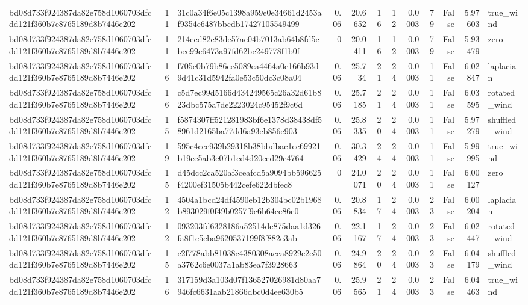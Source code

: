 \begin{tabular}{lrlrrrrrrrrl}
bd08d733f924387da82e758d1060703dfcdd121f360b7e8765189d8b7446e202 & 11 & 31c0a34f6e05c1398a959e0e34661d2453af9354e6487bbcdb17427105549499 & 0.06 & 20.6652 & 16 & 12 & 0.0003 & 79 & False & 5.97603 & true\_wind \\
bd08d733f924387da82e758d1060703dfcdd121f360b7e8765189d8b7446e202 & 11 & 214ecd82c83de57ae04b7013ab64b8fd5cbee99c6473a97fd62bc249778f1b0f & 0 & 20.0411 & 16 & 12 & 0.0003 & 79 & False & 5.93479 & zero \\
bd08d733f924387da82e758d1060703dfcdd121f360b7e8765189d8b7446e202 & 16 & f705c0b79b86ee5089ea4464a0e166b93d9d41c31d5942fa0e53c50dc3c08a04 & 0.06 & 25.734 & 21 & 24 & 0.0003 & 11 & False & 6.02847 & laplacian \\
bd08d733f924387da82e758d1060703dfcdd121f360b7e8765189d8b7446e202 & 16 & c5d7ec99d5166d434249565c26a32d61b823dbc575a7de2223024c95452f9c6d & 0.06 & 25.7185 & 21 & 24 & 0.0003 & 11 & False & 6.03595 & rotated\_wind \\
bd08d733f924387da82e758d1060703dfcdd121f360b7e8765189d8b7446e202 & 15 & f5874307ff521281983bf6e1378d38438df58961d2165ba77dd6a93eb856e903 & 0.06 & 25.8335 & 20 & 24 & 0.0003 & 11 & False & 5.97279 & shuffled\_wind \\
bd08d733f924387da82e758d1060703dfcdd121f360b7e8765189d8b7446e202 & 19 & 595c4cee939b29318b38bbdbac1ec69921b19ce5ab3c07b1cd4d20eed29c4764 & 0.06 & 30.3429 & 24 & 24 & 0.0003 & 11 & False & 5.99995 & true\_wind \\
bd08d733f924387da82e758d1060703dfcdd121f360b7e8765189d8b7446e202 & 15 & d45dcc2ca520af3ceafcd5a9094bb596625f4200ef31505b442cefe622dbfec8 & 0 & 24.0071 & 20 & 24 & 0.0003 & 11 & False & 6.00127 & zero \\
bd08d733f924387da82e758d1060703dfcdd121f360b7e8765189d8b7446e202 & 12 & 4504a1bcd24df4590eb12b304bc02b1968b893029f0f49b0257f9c6b64ce86e0 & 0.06 & 20.8834 & 17 & 24 & 0.0003 & 23 & False & 6.00204 & laplacian \\
bd08d733f924387da82e758d1060703dfcdd121f360b7e8765189d8b7446e202 & 12 & 093203fd6328186a52514de875daa1d326fa8f1c5cba9620537199f8f882c3ab & 0.06 & 22.1167 & 17 & 24 & 0.0003 & 23 & False & 6.02447 & rotated\_wind \\
bd08d733f924387da82e758d1060703dfcdd121f360b7e8765189d8b7446e202 & 15 & c2f778abb81038c4380308acca8929c2c50a3762c6e0037a1ab83ea7f3928663 & 0.06 & 24.9864 & 20 & 24 & 0.0003 & 23 & False & 6.04179 & shuffled\_wind \\
bd08d733f924387da82e758d1060703dfcdd121f360b7e8765189d8b7446e202 & 16 & 317159d3a103d07f136527026981d80aa7946fc6631aab21866dbc0d4ee630b5 & 0.06 & 25.9565 & 21 & 24 & 0.0003 & 23 & False & 6.04463 & true\_wind \\

\end{tabular}
